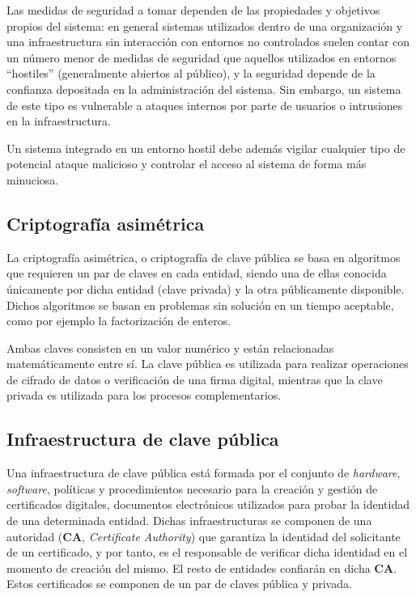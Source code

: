 Las medidas de seguridad a tomar dependen de las propiedades y objetivos propios del sistema: en general sistemas utilizados dentro de una organización y una infraestructura sin interacción con entornos no controlados suelen contar con un número menor de medidas de seguridad que aquellos utilizados en entornos ``hostiles'' (generalmente abiertos al público), y la seguridad depende de la confianza depositada en la administración del sistema. Sin embargo, un sistema de este tipo es vulnerable a ataques internos por parte de usuarios o intrusiones en la infraestructura.

Un sistema integrado en un entorno hostil debe además vigilar cualquier tipo de potencial ataque malicioso y controlar el acceso al sistema de forma más minuciosa.


\subsection{Criptografía asimétrica}

La criptografía asimétrica, o criptografía de clave pública se basa en algoritmos que requieren un par de claves en cada entidad, siendo una de ellas conocida únicamente por dicha entidad (clave privada) y la otra públicamente disponible. Dichos algoritmos se basan en problemas sin solución en un tiempo aceptable, como por ejemplo la factorización de enteros.

Ambas claves consisten en un valor numérico y están relacionadas matemáticamente entre sí. La clave pública es utilizada para realizar operaciones de cifrado de datos o verificación de una firma digital, mientras que la clave privada es utilizada para los procesos complementarios.

\subsection{Infraestructura de clave pública}

Una infraestructura de clave pública está formada por el conjunto de \textit{hardware}, \textit{software}, políticas y procedimientos necesario para la creación y gestión de certificados digitales, documentos electrónicos utilizados para probar la identidad de una determinada entidad. Dichas infraestructuras se componen de una autoridad (\textbf{CA}, \textit{Certificate Authority}) que garantiza la identidad del solicitante de un certificado, y por tanto, es el responsable de verificar dicha identidad en el momento de creación del mismo. El resto de entidades confiarán en dicha \textbf{CA}. Estos certificados se componen de un par de claves pública y privada.

